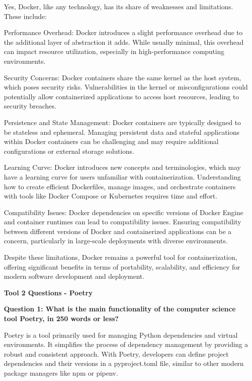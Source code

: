 \documentclass[a4paper, 11pt]{report}
\begin{document}
Yes, Docker, like any technology, has its share of weaknesses and limitations. These include: 

Performance Overhead: Docker introduces a slight performance overhead due to the additional layer of abstraction it adds. While usually minimal, this overhead can impact resource utilization, especially in high-performance computing environments. 

Security Concerns: Docker containers share the same kernel as the host system, which poses security risks. Vulnerabilities in the kernel or misconfigurations could potentially allow containerized applications to access host resources, leading to security breaches. 

Persistence and State Management: Docker containers are typically designed to be stateless and ephemeral. Managing persistent data and stateful applications within Docker containers can be challenging and may require additional configurations or external storage solutions. 

Learning Curve: Docker introduces new concepts and terminologies, which may have a learning curve for users unfamiliar with containerization. Understanding how to create efficient Dockerfiles, manage images, and orchestrate containers with tools like Docker Compose or Kubernetes requires time and effort. 

Compatibility Issues: Docker dependencies on specific versions of Docker Engine and container runtimes can lead to compatibility issues. Ensuring compatibility between different versions of Docker and containerized applications can be a concern, particularly in large-scale deployments with diverse environments. 

Despite these limitations, Docker remains a powerful tool for containerization, offering significant benefits in terms of portability, scalability, and efficiency for modern software development and deployment. 

\vspace{\baselineskip}
\vspace{\baselineskip}
\textbf{\large{Tool 2 Questions - Poetry}}
  
\textbf{Question 1: What is the main functionality of the computer science tool Poetry, in 250 words or less?}

Poetry is a tool primarily used for managing Python dependencies and virtual environments. It simplifies the process of dependency management by providing a robust and consistent approach. With Poetry, developers can define project dependencies and their versions in a pyproject.toml file, similar to other modern package managers like npm or pipenv. 
\end{document}
